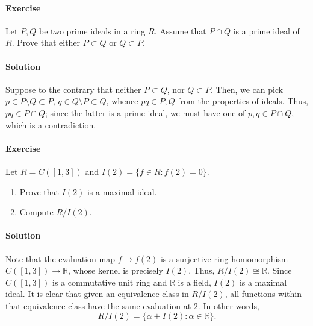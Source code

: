 \documentclass[10pt]{article}
\newcounter{prob}
\newcommand{\problem}{\stepcounter{prob}\paragraph{Exercise \arabic{prob}}}
\newcommand{\solution}{\paragraph{Solution}}
\newcommand{\R}{\mathbb{R}}
\begin{document}
    \problem Let $P, Q$ be two prime ideals in a ring $R$. Assume that $P \cap Q$ is
    a prime ideal of $R$. Prove that either $P \subset Q$ or $Q \subset P$.

    \solution Suppose to the contrary that neither $P \subset Q$, nor $Q \subset P$.
    Then, we can pick $p \in P\setminus Q \subset P$, $q \in Q\setminus P \subset Q$,
    whence $pq \in P, Q$ from the properties of ideals. Thus, $pq \in P \cap Q$;
    since the latter is a prime ideal, we must have one of $p, q \in P \cap Q$, which
    is a contradiction.


    \problem Let $R = C([1, 3])$ and $I(2) = \{f \in R: f(2) = 0\}$. \begin{enumerate}
        \item Prove that $I(2)$ is a maximal ideal.
        \item Compute $R/I(2)$.
    \end{enumerate}

    \solution Note that the evaluation map $f \mapsto f(2)$ is a surjective ring
    homomorphism $C([1, 3]) \to \R$, whose kernel is precisely $I(2)$. Thus,
    $R/I(2)\cong \R$. Since $C([1, 3])$ is a commutative unit ring and $\R$ is a
    field, $I(2)$ is a maximal ideal. It is clear that given an equivalence class in
    $R/I(2)$, all functions within that equivalence class have the same evaluation at
    $2$. In other words, \[
        R/I(2) = \{\alpha + I(2): \alpha \in \R\}.
    \] 
\end{document}
